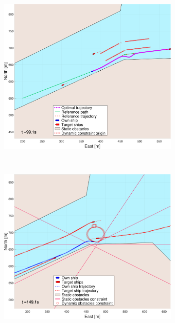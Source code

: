 \begin{figure}[!ht]
\begin{subfigure}[b]{0.494\textwidth}
        \includegraphics[width=\textwidth]{Images/NewFigures/Trheimfjord/_Simple_0fig999_time=100}
        \subcaption{}
    \end{subfigure}
    \hfill
    \\
    \begin{subfigure}[b]{0.494\textwidth}
        \centering
        \includegraphics[width=\textwidth]{Images/NewFigures/Trheimfjord/_Simple_0fig1_time=150}
        \subcaption{}
    \end{subfigure}

\end{figure}
